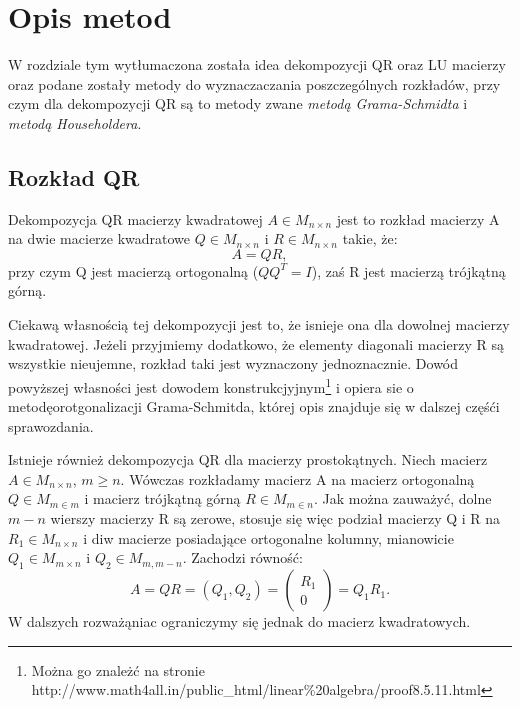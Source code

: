 \section{Opis metod}
W rozdziale tym wytłumaczona została idea dekompozycji QR oraz LU macierzy oraz
podane zostały metody do wyznaczaczania poszczególnych rozkładów, przy czym dla
dekompozycji QR są to metody zwane \textit{metodą Grama-Schmidta} i
\textit{metodą Householdera}.
\subsection{Rozkład QR}
Dekompozycja QR macierzy kwadratowej $A \in M_{n \times n}$ jest to rozkład
macierzy A na dwie macierze kwadratowe $Q \in M_{n \times n}$ i $R \in M_{n
\times n}$ takie, że:
$$A=QR,$$
przy czym Q jest macierzą ortogonalną ($QQ^T=I$), zaś R jest macierzą trójkątną
górną.

Ciekawą własnością tej dekompozycji jest to, że isnieje ona dla dowolnej
macierzy kwadratowej. Jeżeli przyjmiemy dodatkowo, że elementy diagonali
macierzy R są wszystkie nieujemne, rozkład taki jest wyznaczony jednoznacznie.
Dowód powyższej własności jest dowodem konstrukcjyjnym\footnote{Można go znależć
na stronie http://www.math4all.in/public\_html/linear\%20algebra/proof8.5.11.html}
i opiera sie o metodęorotgonalizacji Grama-Schmitda, której opis znajduje się w
dalszej częśći sprawozdania.

Istnieje również dekompozycja QR dla macierzy prostokątnych. Niech macierz
$A \in M_{n \times n}$, $m \geq n$. Wówczas rozkładamy macierz A na macierz
ortogonalną $Q \in M_{m \in m}$ i macierz trójkątną górną $R \in M_{m \in n}$.
Jak można zauważyć, dolne $m-n$ wierszy macierzy R są zerowe, stosuje się więc
podział macierzy Q i R na $R_1 \in M_{n \times n}$ i diw macierze posiadające
ortogonalne kolumny, mianowicie $Q_1 \in M_{m \times n}$ i $Q_2 \in M_{m, m-n}$.
Zachodzi równość:
$$A=QR=(Q_1, Q_2)=\begin{pmatrix} R_1 \\ 0 \end{pmatrix}=Q_1R_1.$$
W dalszych rozważąniac ograniczymy się jednak do macierz kwadratowych.
